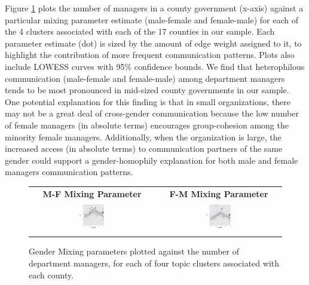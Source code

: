 \documentclass{pnastwo}
\begin{document}
\begin{article}
\begin{figure}
\end{figure}


Figure \ref{fig:mixing parameters size} plots the number of managers in a county government (x-axis) against a particular mixing parameter estimate (male-female and female-male) for each of the 4 clusters associated with each of the 17 counties in our sample. Each parameter estimate (dot) is sized by the amount of edge weight assigned to it, to highlight the contribution of more frequent communication patterns. Plots also include LOWESS curves with 95\% confidence bounds. We find that heterophilous communication (male-female and female-male) among department managers tends to be most pronounced in mid-sized county governments in our sample. One potential explanation for this finding is that in small organizations, there may not be a great deal of cross-gender communication because the low number of female managers (in absolute terms) encourages group-cohesion among the minority female managers. Additionally, when the organization is large, the increased access (in absolute terms) to communication partners of the same gender could support a gender-homophily explanation for both male and female managers communication patterns.

\begin{figure}[h]
	\begin{tabular}{cc}
	\textbf{M-F Mixing Parameter} & \textbf{F-M Mixing Parameter}  \\
	\includegraphics[width = 0.22\textwidth]{images/MF_Size.pdf} &
	\includegraphics[width = 0.22\textwidth]{images/FM_Size.pdf} \\
	\caption{\label{fig:mixing parameters size} Gender Mixing parameters plotted against the number of department managers, for each of four topic clusters associated with each county.}
	\end{tabular}
	

\end{figure}
\end{article}
\end{document}
